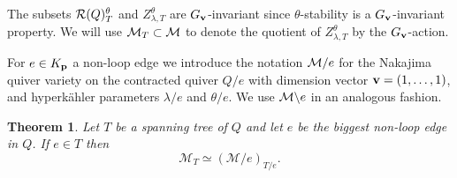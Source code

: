\documentclass{amsart}
\newtheorem{thm}{Theorem}[section]
\newtheorem{lem}[thm]{Lemma}
\theoremstyle{definition}
\newtheorem{defn}[thm]{Definition}
\begin{document}
The subsets $\mathcal{R}(Q)_T^\theta$ and $Z_{\lambda,T}^\theta$ are $G_{\mathbf{v}}$-invariant since $\theta$-stability is a $G_{\mathbf{v}}$-invariant property.
We will use $\mathcal{M}_T \subset \mathcal{M}$ to denote the quotient of $Z_{\lambda,T}^\theta$ by the $G_{\mathbf{v}}$-action. 

For $e\in K_{\mathbf{p}}$ a non-loop edge we introduce the notation $\mathcal{M}/e$ for the Nakajima quiver variety on the contracted quiver $Q/e$ with dimension vector $\mathbf{v}= (1,\ldots,1)$, and hyperk\"ahler parameters $\lambda/e$ and $\theta/e$.
We use $\mathcal{M} \backslash e$ in an analogous fashion.

\begin{thm}\label{thm:contract}
Let $T$ be a spanning tree of $Q$ and let $e$ be the biggest non-loop edge in $Q$. 
If $e \in T$ then $$\mathcal{M}_T \simeq (\mathcal{M}/e)_{T/e}.$$
\end{thm}
\end{document}
